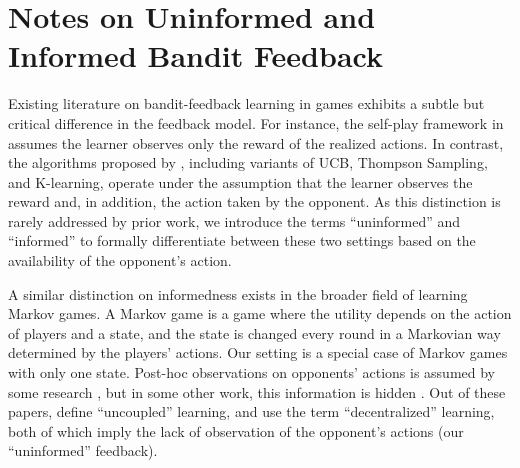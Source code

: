 \section{Notes on Uninformed and Informed Bandit Feedback}\label{h1a:uninformed-informed}

Existing literature on bandit-feedback learning in games exhibits a subtle but critical difference in the feedback model. For instance, the self-play framework in \citet{ito2025instancedependent} assumes the learner observes only the reward of the realized actions.
In contrast, the algorithms proposed by \citet{odonoghue2021matrix}, including variants of UCB, Thompson Sampling, and K-learning, operate under the assumption that the learner observes the reward and, in addition, the action taken by the opponent.
As this distinction is rarely addressed by prior work,
we introduce the terms ``uninformed'' and ``informed'' to formally differentiate between these two settings based on the availability of the opponent's action.

A similar distinction on informedness exists in the broader field of learning Markov games.
A Markov game is a game where the utility depends on the action of players and a state, and the state is changed every round in a Markovian way determined by the players' actions.
Our setting is a special case of Markov games with only one state.
Post-hoc observations on opponents' actions is assumed by some research \citep{wei2017online, bai2020provable, xie2020learning, liu2021sharp},
but in some other work, this information is hidden \citep{tian2021online, mao2022improving, cai2023uncoupled, appel2025regret}.
Out of these papers, \citet{cai2023uncoupled} define ``uncoupled'' learning, and \citet{mao2022improving} use the term ``decentralized'' learning, both of which imply the lack of observation of the opponent's actions (our ``uninformed'' feedback).


